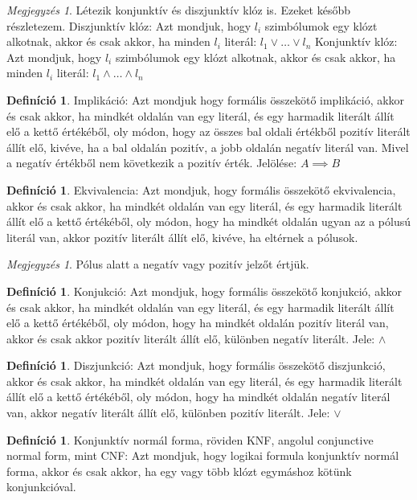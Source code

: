 \documentclass[
]{thesis-ekf}
\theoremstyle{definition}
\newtheorem{definicio}[tetel]{Definíció}
\theoremstyle{remark}
\newtheorem{megjegyzes}[tetel]{Megjegyzés}
\begin{document}
	\begin{megjegyzes}
		Létezik konjunktív és diszjunktív klóz is. Ezeket később részletezem.
		Diszjunktív klóz: Azt mondjuk, hogy $ l_{i} $ szimbólumok egy klózt alkotnak, akkor és csak akkor, ha minden $ l_{i} $ literál: $ l_{1}\vee\dots\vee l_{n} $
		Konjunktív klóz: Azt mondjuk, hogy $ l_{i} $ szimbólumok egy klózt alkotnak, akkor és csak akkor, ha minden $ l_{i} $ literál: $ l_{1}\wedge\dots\wedge l_{n} $
	\end{megjegyzes}
	\begin{definicio}
		Implikáció: Azt mondjuk hogy formális összekötő implikáció, akkor és csak akkor, ha mindkét oldalán van egy literál, és egy harmadik literált állít elő a kettő értékéből, oly módon, hogy az összes bal oldali értékből pozitív literált állít elő, kivéve, ha a bal oldalán pozitív, a jobb oldalán negatív literál van.
		Mivel a negatív értékből nem következik a pozitív érték. Jelölése: $ A \implies B $
	\end{definicio}
	\begin{definicio}
		Ekvivalencia: Azt mondjuk, hogy formális összekötő ekvivalencia, akkor és csak akkor, ha mindkét oldalán van egy literál, és egy harmadik literált állít elő a kettő értékéből, oly módon, hogy ha mindkét oldalán ugyan az a pólusú literál van, akkor pozitív literált állít elő, kivéve, ha eltérnek a pólusok.
	\end{definicio}
	\begin{megjegyzes}
		Pólus alatt a negatív vagy pozitív jelzőt értjük.
	\end{megjegyzes}
	\begin{definicio}
		Konjukció: Azt mondjuk, hogy formális összekötő konjukció, akkor és csak akkor, ha mindkét oldalán van egy literál, és egy harmadik literált állít elő a kettő értékéből, oly módon, hogy ha mindkét oldalán pozitív literál van, akkor és csak akkor pozitív literált állít elő, különben negatív literált. Jele: $\wedge$
	\end{definicio}
	\begin{definicio}
		Diszjunkció: Azt mondjuk, hogy formális összekötő diszjunkció, akkor és csak akkor, ha mindkét oldalán van egy literál, és egy harmadik literált állít elő a kettő értékéből, oly módon, hogy ha mindkét oldalán negatív literál van, akkor negatív literált állít elő, különben pozitív literált. Jele: $\vee$
	\end{definicio}
	\begin{definicio} %
		Konjunktív normál forma, röviden KNF, angolul conjunctive normal form, mint CNF: Azt mondjuk, hogy logikai formula konjunktív normál forma, akkor és csak akkor, ha egy vagy több klózt egymáshoz kötünk konjunkcióval.
	\end{definicio}
\end{document}
